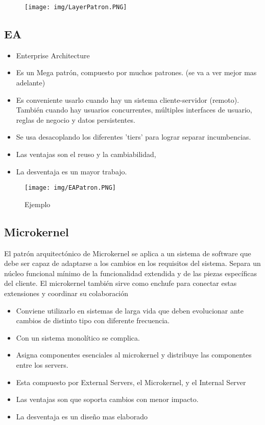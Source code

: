\begin{figure}[!htb]
    \centering
    \texttt{[image: img/LayerPatron.PNG]}
\end{figure}

\subsection*{EA}
\begin{itemize}
\item Enterprise Architecture
\item Es un Mega patrón, compuesto por muchos patrones. (se va a ver mejor mas adelante)
\item Es conveniente usarlo cuando hay un sistema cliente-servidor (remoto). También cuando hay usuarios concurrentes, múltiples interfaces de usuario, reglas de negocio y datos persistentes.
\item Se usa desacoplando los diferentes 'tiers' para lograr separar incumbencias.
\item Las ventajas son el reuso y la cambiabilidad,
\item La desventaja es un mayor trabajo.
\end{itemize}


\begin{figure}[!htb]
    \centering
    \texttt{[image: img/EAPatron.PNG]}
    \caption{Ejemplo}
\end{figure}


\subsection*{Microkernel}
El patrón arquitectónico de Microkernel se aplica a un sistema de software que debe ser capaz de adaptarse a los cambios en los requisitos del sistema. Separa un núcleo funcional mínimo de la funcionalidad extendida y de las piezas específicas del cliente. El microkernel también sirve como enchufe para conectar estas extensiones y coordinar su colaboración
\begin{itemize}
\item Conviene utilizarlo en sistemas de larga vida que deben evolucionar ante cambios de distinto tipo con diferente frecuencia.
\item Con un sistema monolítico se complica.
\item Asigna componentes esenciales al microkernel y distribuye las componentes entre los servers.
\item Esta compuesto por External Servers, el Microkernel, y el Internal Server
\item Las ventajas son que soporta cambios con menor impacto.
\item La desventaja es un diseño mas elaborado
\end{itemize}

